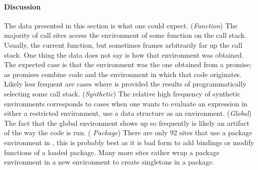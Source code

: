 \documentclass[review,screen,acmsmall,anonymous=true]{acmart}
\begin{document}
\paragraph{Discussion}
The data presented in this section is what one could expect. ({\it Function})
The majority of \eval call sites access the environment of some function on the
call stack. Usually, the current function, but sometimes frames arbitrarily far
up the call stack. One thing the data does not say is how that environment was
obtained. The expected case is that the environment was the one obtained from a
promise; as promises combine code and the environment in which that code
originates. Likely less frequent are cases where \eval is provided the results
of programmatically selecting some call stack. ({\it Synthetic}) The relative
high frequency of synthetic environments corresponds to cases when one wants to
evaluate an expression in either a restricted environment, use a data
structure as an environment. ({\it Global}) The fact that the global environment
shows up so frequently is likely an artifact of the way the code is run. ({\it
  Package}) There are only 92 sites that use a package environment in \eval,
this is probably best as it is bad form to add bindings or modify functions
of a loaded package. Many more sites rather wrap a package environment in a new
environment to create singletons in a package.


\end{document}
